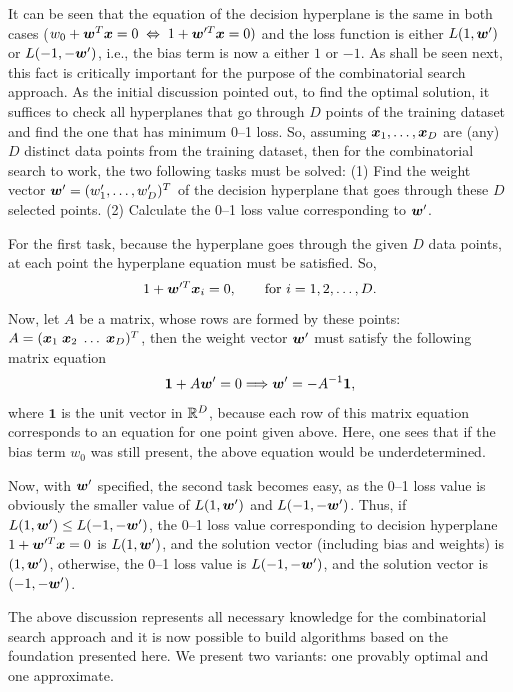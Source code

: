 It can be seen that the equation of the decision hyperplane is the same in both cases 
($w_0 + \boldsymbol{w}^T\boldsymbol{x} = 0 \;  \Leftrightarrow \; 1 + \boldsymbol{w}'^T \boldsymbol{x} = 0)$
and the loss
function is either $L(1, \boldsymbol{w}')$ or $L(-1, -\boldsymbol{w}')$, i.e., the bias term
is now a either $1$ or $-1$. As shall be
seen next, this fact is critically important for the purpose of the
combinatorial search approach. As the initial discussion 
pointed out, to find the optimal solution, it suffices to
check all hyperplanes that go through $D$ points of the training
dataset and find the one that has minimum 0--1 loss. So, assuming
$\boldsymbol{x}_1, \dots, \boldsymbol{x}_D$ are (any) $D$ distinct
data points from the training dataset, then for the combinatorial
search to work, the two following tasks must be solved:
(1) Find the weight vector $\boldsymbol{w}'=(w'_1, \dots, w'_D)^T$ of the
  decision hyperplane that goes through these $D$ selected points.
(2) Calculate the 0--1 loss value corresponding to $\boldsymbol{w}'$.

For the first task, because the hyperplane goes through the given $D$
data points, at each point the hyperplane equation must be
satisfied. So,
$$ 1+ \boldsymbol{w}'^T\boldsymbol{x}_i = 0, \quad\quad \text{for } i = 1, 2, \dots, D.$$
Now, let $A$ be a matrix, whose rows are formed by these points: 
$A =(\boldsymbol{x}_1\; \boldsymbol{x}_2\; \dots \; \boldsymbol{x}_D)^T$,
then the weight vector $\boldsymbol{w}'$ must satisfy the following matrix equation 
\begin{equation}\label{eq:matrix}
\boldsymbol{1} + A \boldsymbol{w}' = 0 \Longrightarrow \boldsymbol{w}' = -A^{-1}\boldsymbol{1},
\end{equation}
where $\boldsymbol{1}$ is the unit vector in $\mathbb{R}^D$, because each row
of this matrix equation corresponds to an equation for one point given
above. Here, one sees that if the bias term $w_0$ was still present,
the above equation would be underdetermined.

Now, with $\boldsymbol{w}'$ specified, the second task becomes easy, as the 0--1
loss value is obviously the smaller value of $L(1,\boldsymbol{w}')$ and $L(-1,
-\boldsymbol{w}')$. Thus, if $L(1,\boldsymbol{w}') \leq L(-1,-\boldsymbol{w}')$, the 0--1 loss value
corresponding to decision hyperplane $1+\boldsymbol{w}'^T\boldsymbol{x} = 0$ is
$L(1,\boldsymbol{w}')$, and the solution vector (including bias and weights) is
$(1, \boldsymbol{w}')$, otherwise, the 0--1 loss value is $L(-1,-\boldsymbol{w}')$, and the
solution vector is $(-1,-\boldsymbol{w}')$.

The above discussion represents all necessary knowledge for the
combinatorial search approach and it is now possible to build
algorithms based on the foundation presented here.  We present
two variants: one provably optimal and one approximate.

